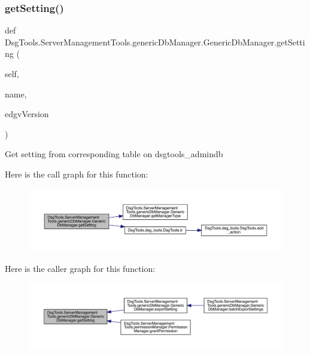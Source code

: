\subsubsection{\texorpdfstring{get\+Setting()}{getSetting()}}
{\footnotesize\ttfamily def Dsg\+Tools.\+Server\+Management\+Tools.\+generic\+Db\+Manager.\+Generic\+Db\+Manager.\+get\+Setting (\begin{DoxyParamCaption}\item[{}]{self,  }\item[{}]{name,  }\item[{}]{edgv\+Version }\end{DoxyParamCaption})}

\begin{DoxyVerb}Get setting from corresponding table on dsgtools_admindb
\end{DoxyVerb}
 Here is the call graph for this function\+:
\nopagebreak
\begin{figure}[H]
\begin{center}
\leavevmode
\includegraphics[width=350pt]{class_dsg_tools_1_1_server_management_tools_1_1generic_db_manager_1_1_generic_db_manager_a31b4f877b09455ef4b360fb141fdb72e_cgraph}
\end{center}
\end{figure}
Here is the caller graph for this function\+:
\nopagebreak
\begin{figure}[H]
\begin{center}
\leavevmode
\includegraphics[width=350pt]{class_dsg_tools_1_1_server_management_tools_1_1generic_db_manager_1_1_generic_db_manager_a31b4f877b09455ef4b360fb141fdb72e_icgraph}
\end{center}
\end{figure}
\mbox{\label{class_dsg_tools_1_1_server_management_tools_1_1generic_db_manager_1_1_generic_db_manager_a4817d8093103ba3574d693fb172ad89b}} 
